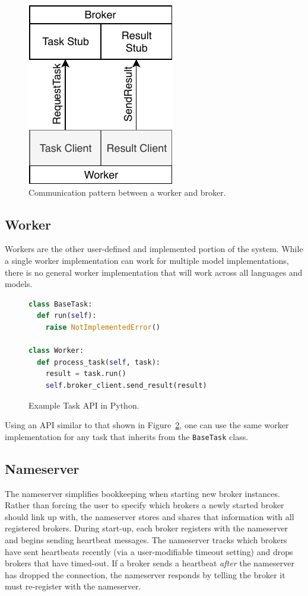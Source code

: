\documentclass[conference]{IEEEtran}
\begin{document}
\begin{figure}
  \centering
  \includegraphics{img/broker_worker}
  \caption{Communication pattern between a worker and broker.}
  \label{fig:worker-broker}
\end{figure}

\subsection{Worker}
Workers are the other user-defined and implemented portion of the system. While
a single worker implementation can work for multiple model implementations, there
is no general worker implementation that will work across all languages and models.

\begin{figure}
  \begin{lstlisting}[language=python]
class BaseTask:
  def run(self):
    raise NotImplementedError()

class Worker:
  def process_task(self, task):
    result = task.run()
    self.broker_client.send_result(result)
  \end{lstlisting}
  \caption{Example Task API in Python.}\label{fig:python-api}
\end{figure}

Using an API similar to that shown in Figure~\ref{fig:python-api}, one can use
the same worker implementation for any task that inherits from the \texttt{BaseTask}
class.

\subsection{Nameserver}
The nameserver simplifies bookkeeping when starting new broker instances.
Rather than forcing the user to specify which brokers a newly started broker
should link up with, the nameserver stores and shares that information with
all registered brokers. During start-up, each broker registers with the nameserver
and begins sending heartbeat messages. The nameserver tracks which brokers have
sent heartbeats recently (via a user-modifiable timeout setting) and drops brokers
that have timed-out. If a broker sends a heartbeat \emph{after} the nameserver has
dropped the connection, the nameserver responds by telling the broker it must
re-register with the nameserver.
\end{document}
